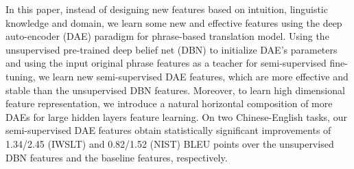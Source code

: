 In this paper, instead of designing new features based on intuition, linguistic knowledge and domain, we learn some new and effective features using the deep auto-encoder (DAE) paradigm for phrase-based translation model. Using the unsupervised pre-trained deep belief net (DBN) to initialize DAE's parameters and using the input original phrase features as a teacher for semi-supervised fine-tuning, we learn new semi-supervised DAE features, which are more effective and stable than the unsupervised DBN features. Moreover, to learn high dimensional feature representation, we introduce a natural horizontal composition of more DAEs for large hidden layers feature learning. On two Chinese-English tasks, our semi-supervised DAE features obtain statistically significant improvements of 1.34/2.45 (IWSLT) and 0.82/1.52 (NIST) BLEU points over the unsupervised DBN features and the baseline features, respectively.
